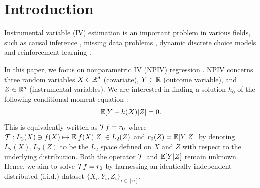\vspace{-2mm}
\section{Introduction}\label{sec:intro}
\vspace{-2mm}

Instrumental variable (IV) estimation is an important problem in various fields, such as causal inference \citep{angrist1995identification, newey2003instrumental,deaner2018proxy,cui2020semiparametric,kallus2021causal,kallus2022causal}, missing data problems \citep{miao2018confounding,wang2014instrumental}, dynamic discrete choice models \cite{kalouptsidi2021linear}  and reinforcement learning \citep{liao2021instrumental,uehara2022future,uehara2022provably,shi2022minimax,wang2021provably,yu2022strategic}. 

In this paper, we focus on nonparametric IV (NPIV) regression \citep{newey2003instrumental}.  NPIV concerns three random variables $X \in \mathbb{R}^d$ (covariate), $Y \in \mathbb{R}$ (outcome variable), and $Z \in \mathbb{R}^d$ (instrumental variables). 
We are interested in finding a solution $h_0$ of the following conditional moment equation \citep{dikkala2020minimax, chernozhukov2019inference}:   $$
\mathbb{E}[Y - h(X)|Z] = 0.
$$
This is equivalently written as ${\mathcal{T}} f=r_0$ where ${\mathcal{T}}: L_2(X)\ni f(X) \mapsto \mathbb{E}[f(X)|Z]\in L_2(Z)$ and $r_0(Z) = \mathbb{E}[Y|Z]$ by denoting $L_2(X), L_2(Z)$ to be the $L_2$ space defined on $X$ and $Z$ with respect to the underlying distribution. Both the operator ${\mathcal{T}}$ and $\mathbb{E}[Y|Z]$ remain unknown. Hence, we aim to solve ${\mathcal{T}} f=r_0$ by harnessing an identically independent distributed (i.i.d.) dataset $\{X_i, Y_i, Z_i\}_{i\in[n]}$. 

